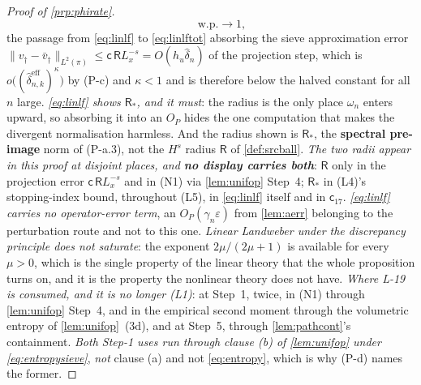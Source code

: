 \begin{proof}[Proof of \cref{prp:phirate}]
\begin{equation}
\qquad\text{w.p.}\to1 ,
\end{equation}
the passage from \eqref{eq:linlf} to \eqref{eq:linlftot} absorbing the sieve approximation error
$\|v_\dagger-\bar v_\dagger\|_{L^{2}(\pi)}\le\mathsf c\,\mathsf RL_x^{-s}=O(h_u\hat\delta_n)$ of the
projection step, which is $o\big((\hat\delta^{\mathrm{eff}}_{n,k})^{\kappa}\big)$ by (P-c) and $\kappa<1$
and is therefore below the halved constant for all $n$ large.
\emph{\eqref{eq:linlf} shows $\mathsf R_\ast$, and it must}: the radius is the
only place $\omega_n$ enters upward, so absorbing it into an $O_P$ hides the one computation that makes
the divergent normalisation harmless. And the radius shown is $\mathsf R_\ast$, the \textbf{spectral
pre-image} norm of (P-a.3), not the $H^{s}$ radius $\mathsf R$ of \cref{def:srcball}. \emph{The two radii
appear in this proof at disjoint places, and \textbf{no display carries both}}: $\mathsf R$ only in the
projection error $\mathsf c\,\mathsf RL_x^{-s}$ and in (N1) via \cref{lem:unifop} Step~4; $\mathsf R_\ast$
in (L4)'s stopping-index bound, throughout (L5), in \eqref{eq:linlf} itself and in $\mathsf c_{17}$.
\emph{\eqref{eq:linlf} carries no operator-error
term}, an $O_P(\gamma_n\varepsilon)$ from \cref{lem:aerr} belonging to the
perturbation route and not to this one.
\emph{Linear Landweber under the discrepancy principle does not saturate}: the exponent
$2\mu/(2\mu+1)$ is available for every $\mu>0$, which is the single property of the linear theory that
the whole proposition turns on, and it is the property the nonlinear theory does not have. \emph{Where
L-19 is consumed, and it is no longer (L1)}: at Step~1, twice, in (N1) through \cref{lem:unifop}
Step~4, and in the empirical second moment through the volumetric entropy of \cref{lem:unifop}~(3d), 
and at Step~5, through \cref{lem:pathcont}'s containment. \emph{Both Step-1 uses run through clause (b)
of \cref{lem:unifop} under \eqref{eq:entropysieve}}, \emph{not} clause (a) and not \eqref{eq:entropy},
which is why (P-d) names the former.


\end{proof}
